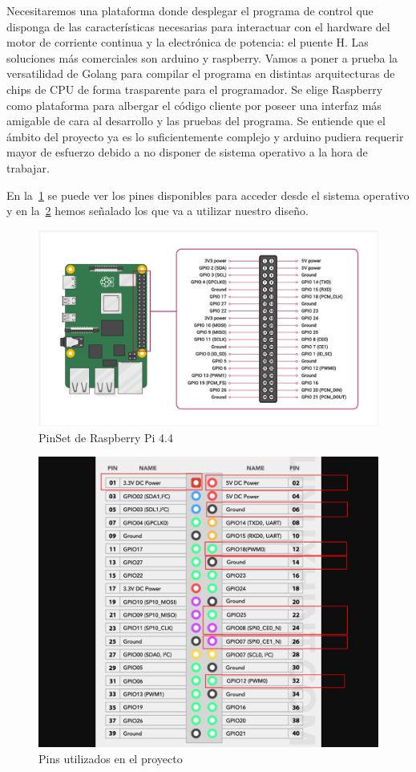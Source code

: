 
Necesitaremos una plataforma donde desplegar el programa de control que disponga de las características necesarias para interactuar con el hardware del  motor de corriente continua y la electrónica de potencia: el puente H. Las soluciones más comerciales son arduino y raspberry.
Vamos a poner a prueba la versatilidad de Golang para compilar el programa en distintas arquitecturas de chips de CPU de forma trasparente para el programador.
Se elige Raspberry como plataforma para albergar el código cliente por poseer una interfaz más amigable de cara al desarrollo y las pruebas del programa.
Se entiende que el ámbito del proyecto ya es lo suficientemente complejo y arduino pudiera requerir mayor de esfuerzo debido a no disponer de sistema operativo a la hora de trabajar.

En la~\cref{fig:raspberry pins} se puede ver los pines disponibles para acceder desde el sistema operativo y en la~\cref{fig:Used Pins} hemos señalado los que va a utilizar nuestro diseño.

\begin{figure}[H]
    \centering
    \includegraphics[scale = 0.4]{part/Proyecto_ejecutivo/memoria_constructiva/raspb/img/raspberry}
    \caption{PinSet de Raspberry Pi 4.4\cite{raspberryORG} }\label{fig:raspberry pins}
\end{figure}

\begin{figure}[H]
    \centering
    \includegraphics[scale = 0.4]{part/Proyecto_ejecutivo/memoria_constructiva/raspb/img/gpio-pinout-raspberry-pi-01-used}
    \caption{Pins utilizados en el proyecto}\label{fig:Used Pins}
\end{figure}